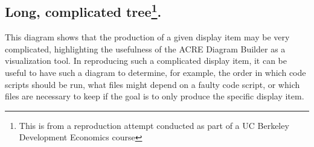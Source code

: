 \documentclass[]{book}
\begin{document}
\hypertarget{long-complicated-tree.}{%
\subsection[Long, complicated tree.]{\texorpdfstring{Long, complicated tree\footnote{This is from a reproduction attempt conducted as part of a UC Berkeley Development Economics course}.}{Long, complicated tree.}}\label{long-complicated-tree.}}

This diagram shows that the production of a given display item may be very complicated, highlighting the usefulness of the ACRE Diagram Builder as a visualization tool. In reproducing such a complicated display item, it can be useful to have such a diagram to determine, for example, the order in which code scripts should be run, what files might depend on a faulty code script, or which files are necessary to keep if the goal is to only produce the specific display item.
\end{document}
